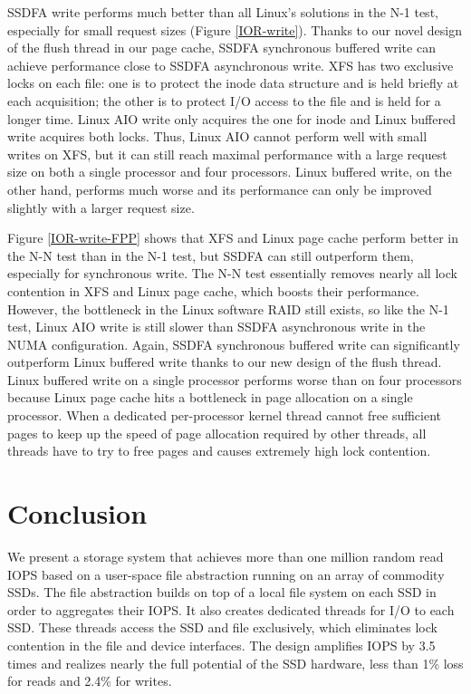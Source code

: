 SSDFA write performs much better than all Linux's solutions in the N-1 test,
especially for small request sizes (Figure \ref{IOR-write}). Thanks to
our novel design of the flush thread in our page cache, SSDFA synchronous
buffered write can achieve performance close to SSDFA asynchronous write.
XFS has two exclusive locks on each file: one is to protect the inode data
structure and is held briefly at each acquisition; the other is
to protect I/O access to the file and is held for a longer time. Linux
AIO write only acquires the one for inode and Linux buffered write acquires
both locks. Thus, Linux AIO cannot perform well with small writes on XFS,
but it can still reach maximal performance with a large request size on both
a single processor and four processors. Linux buffered write, on the other
hand, performs much worse and its performance can only be improved slightly
with a larger request size.

Figure \ref{IOR-write-FPP} shows that XFS and Linux page cache perform
better in the N-N test than in the N-1 test, but SSDFA can still outperform them,
especially
for synchronous write. The N-N test essentially removes nearly all lock
contention in XFS and Linux page cache, which boosts their performance.
However, the bottleneck in the Linux software RAID still exists, so like
the N-1 test, Linux AIO write is still slower than SSDFA asynchronous
write in the NUMA configuration. Again, SSDFA synchronous buffered write
can significantly outperform Linux buffered write thanks to our new design
of the flush thread. Linux buffered write on a single processor
performs worse than on four processors because Linux page cache hits
a bottleneck in page allocation on a single processor. When a dedicated
per-processor kernel thread cannot free sufficient pages to keep
up the speed of page allocation required by other threads, all threads
have to try to free pages and causes extremely high lock contention.

\section{Conclusion}
We present a storage system that achieves more than one million
random read IOPS based on a user-space file abstraction running
on an array of commodity SSDs.  The file abstraction builds on top of 
a local file system on each SSD in order to aggregates their IOPS.
It also creates dedicated threads for I/O to each SSD.  These threads
access the SSD and file exclusively, which eliminates lock contention 
in the file and device interfaces.
The design amplifies IOPS by 3.5 times and realizes nearly the 
full potential of the SSD hardware, less than 1\% loss for reads
and 2.4\% for writes.

